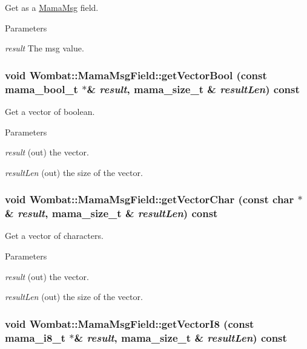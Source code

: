 Get as a \hyperlink{classWombat_1_1MamaMsg}{MamaMsg} field. 
\begin{DoxyParams}{Parameters}
\item[{\em result}]The msg value. \end{DoxyParams}
\hypertarget{classWombat_1_1MamaMsgField_af47ff9ee2d30cc56a6133d9b90923152}{
\subsubsection[{getVectorBool}]{\setlength{\rightskip}{0pt plus 5cm}void Wombat::MamaMsgField::getVectorBool (const mama\_\-bool\_\-t $\ast$\& {\em result}, \/  {\bf mama\_\-size\_\-t} \& {\em resultLen}) const}}
\label{classWombat_1_1MamaMsgField_af47ff9ee2d30cc56a6133d9b90923152}


Get a vector of boolean. 
\begin{DoxyParams}{Parameters}
\item[{\em result}](out) the vector. \item[{\em resultLen}](out) the size of the vector. \end{DoxyParams}
\hypertarget{classWombat_1_1MamaMsgField_a8779a6a8bd574fdbbc00f3164f828bc4}{
\subsubsection[{getVectorChar}]{\setlength{\rightskip}{0pt plus 5cm}void Wombat::MamaMsgField::getVectorChar (const char $\ast$\& {\em result}, \/  {\bf mama\_\-size\_\-t} \& {\em resultLen}) const}}
\label{classWombat_1_1MamaMsgField_a8779a6a8bd574fdbbc00f3164f828bc4}


Get a vector of characters. 
\begin{DoxyParams}{Parameters}
\item[{\em result}](out) the vector. \item[{\em resultLen}](out) the size of the vector. \end{DoxyParams}
\hypertarget{classWombat_1_1MamaMsgField_a08f245644d691bb7151ddb4fe2f673dc}{
\subsubsection[{getVectorI8}]{\setlength{\rightskip}{0pt plus 5cm}void Wombat::MamaMsgField::getVectorI8 (const mama\_\-i8\_\-t $\ast$\& {\em result}, \/  {\bf mama\_\-size\_\-t} \& {\em resultLen}) const}}
\label{classWombat_1_1MamaMsgField_a08f245644d691bb7151ddb4fe2f673dc}


